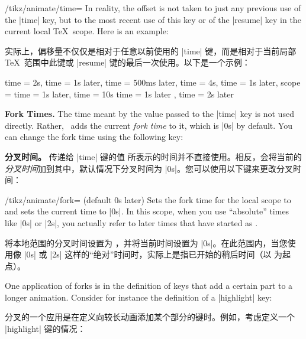 \begin{key}{/tikz/animate/time=}
    In reality, the offset is not taken to just any previous use of the |time|
    key, but to the most recent use of this key or of the |resume| key in the
    current local \TeX\ scope. Here is an example:
    
    实际上，偏移量不仅仅是相对于任意以前使用的 |time| 键，而是相对于当前局部 \TeX\ 范围中此键或 |resume| 键的最后一次使用。以下是一个示例：


\begin{codeexample}
time = 2s,
time = 1s later,    %
time = 500ms later, %
time = 4s,
time = 1s later,    %
scope = {           %
  time = 1s later,  %
  time = 10s
  time = 1s later   %
},                  %
time = 2s later     %
\end{codeexample}

    \medskip\textbf{Fork Times.}
    The time meant by the value  passed to the |time| key is not
    used directly. Rather, \tikzname\ adds the current \emph{fork time} to it,
    which is |0s| by default. You can change the fork time using the following
    key:
    
    \medskip\textbf{分叉时间。}
传递给 |time| 键的值  所表示的时间并不直接使用。相反，\tikzname 会将当前的\emph{分叉时间}加到其中，默认情况下分叉时间为 |0s|。您可以使用以下键来更改分叉时间：


    \begin{key}{/tikz/animate/fork= (default 0s later)}
        Sets the fork time for the local scope to  and sets the current
        time to |0s|. In this scope, when you use ``absolute'' times like |0s|
        or |2s|, you actually refer to later times that have started as
        .

        将本地范围的分叉时间设置为 ，并将当前时间设置为 |0s|。在此范围内，当您使用像 |0s| 或 |2s| 这样的“绝对”时间时，实际上是指已开始的稍后时间（以  为起点）。



        One application of forks is in the definition of keys that add a
        certain part to a longer animation. Consider for instance the
        definition of a |highlight| key:

        分叉的一个应用是在定义向较长动画添加某个部分的键时。例如，考虑定义一个 |highlight| 键的情况：



\end{key}
\end{key}
